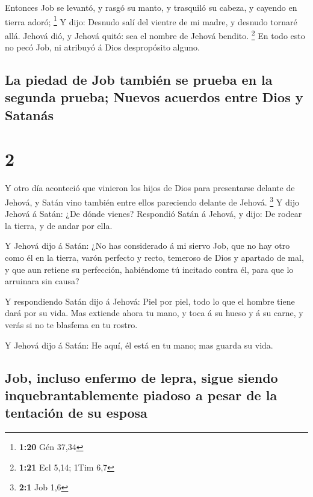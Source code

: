  Entonces Job se levantó, y rasgó su manto, y trasquiló
su cabeza, y cayendo en tierra adoró; \footnote{\textbf{1:20} Gén 37,34}
 Y dijo: Desnudo salí del vientre de mi madre, y desnudo
tornaré allá. Jehová dió, y Jehová quitó: sea el nombre de Jehová
bendito. \footnote{\textbf{1:21} Ecl 5,14; 1Tim 6,7}  En
todo esto no pecó Job, ni atribuyó á Dios despropósito alguno.

\hypertarget{la-piedad-de-job-tambiuxe9n-se-prueba-en-la-segunda-prueba-nuevos-acuerdos-entre-dios-y-satanuxe1s}{%
\subsection{La piedad de Job también se prueba en la segunda prueba;
Nuevos acuerdos entre Dios y
Satanás}\label{la-piedad-de-job-tambiuxe9n-se-prueba-en-la-segunda-prueba-nuevos-acuerdos-entre-dios-y-satanuxe1s}}

\hypertarget{section-1}{%
\section{2}\label{section-1}}

 Y otro día aconteció que vinieron los hijos de Dios para
presentarse delante de Jehová, y Satán vino también entre ellos
pareciendo delante de Jehová. \footnote{\textbf{2:1} Job 1,6}
 Y dijo Jehová á Satán: ¿De dónde vienes? Respondió Satán
á Jehová, y dijo: De rodear la tierra, y de andar por ella.

 Y Jehová dijo á Satán: ¿No has considerado á mi siervo
Job, que no hay otro como él en la tierra, varón perfecto y recto,
temeroso de Dios y apartado de mal, y que aun retiene su perfección,
habiéndome tú incitado contra él, para que lo arruinara sin causa?

 Y respondiendo Satán dijo á Jehová: Piel por piel, todo
lo que el hombre tiene dará por su vida.  Mas extiende
ahora tu mano, y toca á su hueso y á su carne, y verás si no te blasfema
en tu rostro.

 Y Jehová dijo á Satán: He aquí, él está en tu mano; mas
guarda su vida.

\hypertarget{job-incluso-enfermo-de-lepra-sigue-siendo-inquebrantablemente-piadoso-a-pesar-de-la-tentaciuxf3n-de-su-esposa}{%
\subsection{Job, incluso enfermo de lepra, sigue siendo
inquebrantablemente piadoso a pesar de la tentación de su
esposa}\label{job-incluso-enfermo-de-lepra-sigue-siendo-inquebrantablemente-piadoso-a-pesar-de-la-tentaciuxf3n-de-su-esposa}}


